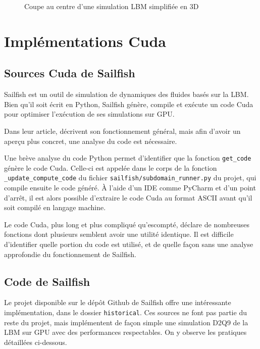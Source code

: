 \begin{figure}[h]
{		\label{fig:lbm_simple_3d_460}
	}
	\caption{Coupe au centre d'une simulation \ac{LBM} simplifiée en 3D}
	\label{fig:lbm_simple_3d}
\end{figure}

\section{Implémentations Cuda}
\subsection{Sources Cuda de Sailfish}
Sailfish est un outil de simulation de dynamiques des fluides basés sur la \ac{LBM}. Bien qu'il soit écrit en Python, Sailfish génère, compile et exécute un code Cuda pour optimiser l'exécution de ses simulations sur \acs{GPU}.

Dans leur article, \citet{januszewski_sailfish_2014} décrivent son fonctionnement général, mais afin d'avoir un aperçu plus concret, une analyse du code est nécessaire. 

Une brève analyse du code Python permet d'identifier que la fonction \texttt{get\_code} génère le code Cuda. Celle-ci est appelée dans le corps de la fonction \texttt{\_update\_compute\_code} du fichier \texttt{sailfish/subdomain\_runner.py} du projet, qui compile ensuite le code généré. À l'aide d'un \acs{IDE} comme PyCharm et d'un point d'arrêt, il est alors possible d'extraire le code Cuda au format \acs{ASCII} avant qu'il soit compilé en langage machine.

Le code Cuda, plus long et plus compliqué qu'escompté, déclare de nombreuses fonctions dont plusieurs semblent avoir une utilité identique. Il est difficile d'identifier quelle portion du code est utilisé, et de quelle façon sans une analyse approfondie du fonctionnement de Sailfish.

\subsection{Code  de Sailfish}
Le projet disponible sur le dépôt Github de Sailfish offre une intéressante implémentation, dans le dossier \texttt{historical}. Ces sources ne font pas partie du reste du projet, mais implémentent de façon simple une simulation D2Q9 de la \acs{LBM} sur \acs{GPU} avec des performances respectables. On y observe les pratiques détaillées ci-dessous.

